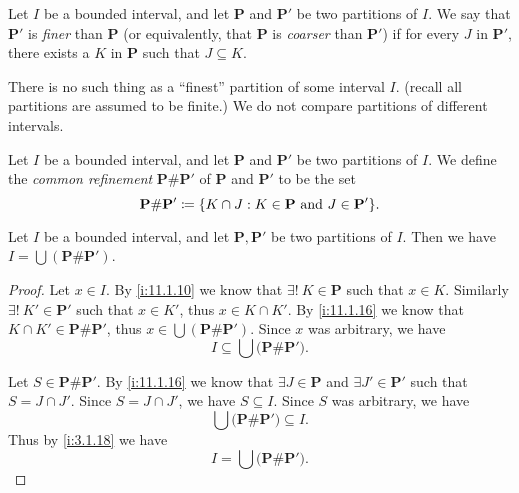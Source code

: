 \begin{defn}\label{i:11.1.14}
  Let \(I\) be a bounded interval, and let \(\mathbf{P}\) and \(\mathbf{P}'\) be two partitions of \(I\).
  We say that \(\mathbf{P}'\) is \emph{finer} than \(\mathbf{P}\) (or equivalently, that \(\mathbf{P}\) is \emph{coarser} than \(\mathbf{P}'\)) if for every \(J\) in \(\mathbf{P}'\), there exists a \(K\) in \(\mathbf{P}\) such that \(J \subseteq K\).
\end{defn}

\begin{note}
  There is no such thing as a ``finest'' partition of some interval \(I\).
  (recall all partitions are assumed to be finite.)
  We do not compare partitions of different intervals.
\end{note}

\setcounter{thm}{15}
\begin{defn}\label{i:11.1.16}
  Let \(I\) be a bounded interval, and let \(\mathbf{P}\) and \(\mathbf{P}'\) be two partitions of \(I\).
  We define the \emph{common refinement} \(\mathbf{P} \# \mathbf{P}'\) of \(\mathbf{P}\) and \(\mathbf{P}'\) to be the set
  \[
    \mathbf{P} \# \mathbf{P}' \coloneqq \set{K \cap J : K \in \mathbf{P} \text{ and } J \in \mathbf{P}'}.
  \]
\end{defn}

\begin{ac}\label{i:ac:11.1.1}
  Let \(I\) be a bounded interval, and let \(\mathbf{P}, \mathbf{P}'\) be two partitions of \(I\).
  Then we have \(I = \bigcup (\mathbf{P} \# \mathbf{P}')\).
\end{ac}

\begin{proof}
  Let \(x \in I\).
  By \cref{i:11.1.10} we know that \(\exists!\ K \in \mathbf{P}\) such that \(x \in K\).
  Similarly \(\exists!\ K' \in \mathbf{P}'\) such that \(x \in K'\), thus \(x \in K \cap K'\).
  By \cref{i:11.1.16} we know that \(K \cap K' \in \mathbf{P} \# \mathbf{P}'\), thus \(x \in \bigcup (\mathbf{P} \# \mathbf{P}')\).
  Since \(x\) was arbitrary, we have
  \[
    I \subseteq \bigcup \big(\mathbf{P} \# \mathbf{P}'\big).
  \]

  Let \(S \in \mathbf{P} \# \mathbf{P}'\).
  By \cref{i:11.1.16} we know that \(\exists J \in \mathbf{P}\) and \(\exists J' \in \mathbf{P}'\) such that \(S = J \cap J'\).
  Since \(S = J \cap J'\), we have \(S \subseteq I\).
  Since \(S\) was arbitrary, we have
  \[
    \bigcup \big(\mathbf{P} \# \mathbf{P}'\big) \subseteq I.
  \]
  Thus by \cref{i:3.1.18} we have
  \[
    I = \bigcup \big(\mathbf{P} \# \mathbf{P}'\big).
  \]
\end{proof}


